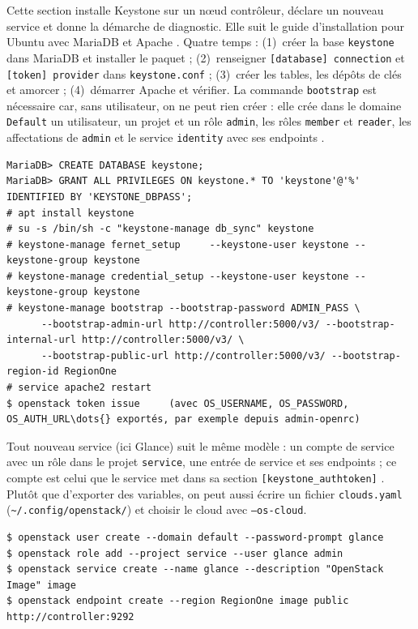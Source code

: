 Cette section installe Keystone sur un nœud contrôleur, déclare un nouveau service et donne la démarche de diagnostic. Elle suit le
guide d'installation pour Ubuntu avec MariaDB et Apache \parencite{keystone-install}. Quatre temps : (1)~créer la base \texttt{keystone}
dans MariaDB et installer le paquet ; (2)~renseigner \texttt{[database] connection} et \texttt{[token] provider} dans
\texttt{keystone.conf} ; (3)~créer les tables, les dépôts de clés et amorcer ; (4)~démarrer Apache et vérifier. La commande
\texttt{bootstrap} est nécessaire car, sans utilisateur, on ne peut rien créer : elle crée dans le domaine \texttt{Default} un
utilisateur, un projet et un rôle \texttt{admin}, les rôles \texttt{member} et \texttt{reader}, les affectations de \texttt{admin} et le
service \texttt{identity} avec ses endpoints \parencite{keystone-bootstrap}.

\par\noindent\begin{minipage}{\linewidth}
\begin{lstlisting}[style=terminal]
MariaDB> CREATE DATABASE keystone;
MariaDB> GRANT ALL PRIVILEGES ON keystone.* TO 'keystone'@'%' IDENTIFIED BY 'KEYSTONE_DBPASS';
# apt install keystone
# su -s /bin/sh -c "keystone-manage db_sync" keystone
# keystone-manage fernet_setup     --keystone-user keystone --keystone-group keystone
# keystone-manage credential_setup --keystone-user keystone --keystone-group keystone
# keystone-manage bootstrap --bootstrap-password ADMIN_PASS \
      --bootstrap-admin-url http://controller:5000/v3/ --bootstrap-internal-url http://controller:5000/v3/ \
      --bootstrap-public-url http://controller:5000/v3/ --bootstrap-region-id RegionOne
# service apache2 restart
$ openstack token issue     (avec OS_USERNAME, OS_PASSWORD, OS_AUTH_URL\dots{} exportés, par exemple depuis admin-openrc)
\end{lstlisting}
\end{minipage}\par

Tout nouveau service (ici Glance) suit le même modèle : un compte de service avec un rôle dans le projet \texttt{service}, une entrée de
service et ses endpoints ; ce compte est celui que le service met dans sa section \texttt{[keystone\_authtoken]}
\parencite{keystone-install}. Plutôt que d'exporter des variables, on peut aussi écrire un fichier \texttt{clouds.yaml}
(\texttt{\textasciitilde/.config/openstack/}) et choisir le cloud avec \texttt{--os-cloud}.

\par\noindent\begin{minipage}{\linewidth}
\begin{lstlisting}[style=terminal]
$ openstack user create --domain default --password-prompt glance
$ openstack role add --project service --user glance admin
$ openstack service create --name glance --description "OpenStack Image" image
$ openstack endpoint create --region RegionOne image public http://controller:9292
\end{lstlisting}
\end{minipage}\par

